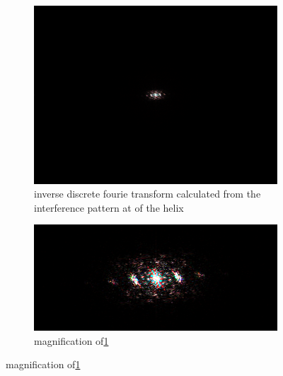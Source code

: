\begin{figure}[H]
    \centering
    \begin{subfigure}{0.48\columnwidth}
        \centering
        \includegraphics[width=0.9\columnwidth]{figures/expantion fourie transform.png}
        \caption{inverse discrete fourie transform calculated from the interference pattern at of the helix }
        \label{fig:expansion inverse fourie transform measured}
    \end{subfigure}\hfill
    \begin{subfigure}{0.48\columnwidth}
        \centering
        \includegraphics[width=\columnwidth]{figures/expantion fourie transform magnified.png} %
        \caption{magnification of\ref{fig:expansion inverse fourie transform measured}}
        \label{fig:expansion fourie transform magnified}
    \end{subfigure}
    \label{fig:expansion theory measurements}
\end{figure}
